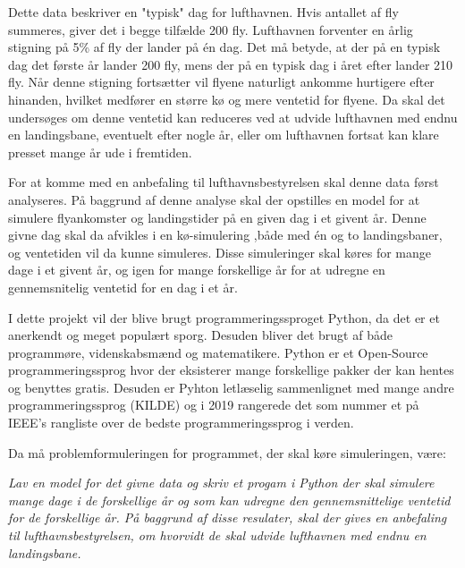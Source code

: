 Dette data beskriver en "typisk" dag for lufthavnen. Hvis antallet af fly summeres, giver det i begge tilfælde 200 fly. Lufthavnen forventer en årlig stigning på 5\% af fly der lander på én dag. Det må betyde, at der på en typisk dag det første år lander 200 fly, mens der på en typisk dag i året efter lander 210 fly. Når denne stigning fortsætter vil flyene naturligt ankomme hurtigere efter hinanden, hvilket medfører en større kø og mere ventetid for flyene. Da skal det undersøges om denne ventetid kan reduceres ved at udvide lufthavnen med endnu en landingsbane, eventuelt efter nogle år, eller om lufthavnen fortsat kan klare presset mange år ude i fremtiden.

For at komme med en anbefaling til lufthavnsbestyrelsen skal denne data først analyseres. På baggrund af denne analyse skal der opstilles en model for at simulere flyankomster og landingstider på en given dag i et givent år.
Denne givne dag skal da afvikles i en kø-simulering ,både med én og to landingsbaner, og ventetiden vil da kunne simuleres.
Disse simuleringer skal køres for mange dage i et givent år, og igen for mange forskellige år for at udregne en gennemsnitelig ventetid for en dag i et år.

I dette projekt vil der blive brugt programmeringssproget Python, da det er et anerkendt og meget populært sporg.
Desuden bliver det brugt af både programmøre, videnskabsmænd og matematikere.
Python er et Open-Source programmeringssprog hvor der eksisterer mange forskellige pakker der kan hentes og benyttes gratis.
Desuden er Pyhton letlæselig sammenlignet med mange andre programmeringssprog (KILDE) og i 2019 rangerede det som nummer et på \textsc{IEEE}'s rangliste over de bedste programmeringssprog i verden. \cite{calc} 

Da må problemformuleringen for programmet, der skal køre simuleringen, være:

\begin{center}
	\textit{Lav en model for det givne data og skriv et progam i Python der skal simulere mange dage i de forskellige år og som kan udregne den gennemsnittelige ventetid for de forskellige år.
	På baggrund af disse resulater, skal der gives en anbefaling til lufthavnsbestyrelsen, om hvorvidt de skal udvide lufthavnen med endnu en landingsbane.}
\end{center}
